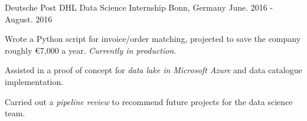 

\begin{cventries}

  \cventry
    {Deutsche Post DHL} %
    {Data Science Internship} %
    {Bonn, Germany} %
    {June. 2016 - August. 2016} %
    {
      \begin{cvitems} %
        \item{Wrote a Python script for invoice/order matching, projected to save the company roughly €7,000 a year. \textit{Currently in production}.}
        \item{Assisted in a proof of concept for \textit{data lake in Microsoft Azure} and data catalogue implementation.}
        \item{Carried out a \textit{pipeline review} to recommend future projects for the data science team.}
      \end{cvitems}
    }

\end{cventries}
